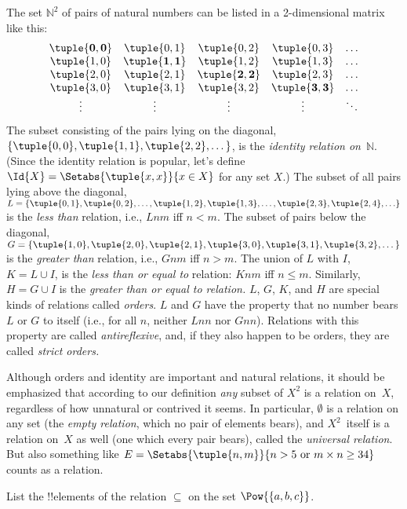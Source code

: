 \documentclass[../../../include/open-logic-section]{subfiles}
\begin{document}
\begin{ex}
The set $\mathbb{N}^{2}$ of
pairs of natural numbers can be listed in a 2-dimensional matrix like
this:
\[
\begin{array}{ccccc}
\mathbf{\tuple{ 0,0 }} & \tuple{ 0,1 } &
  \tuple{ 0,2 } & \tuple{ 0,3 } & \ldots\\
\tuple{ 1,0 } & \mathbf{\tuple{ 1,1 }} &
  \tuple{ 1,2 } & \tuple{ 1,3 } & \ldots\\
\tuple{ 2,0 } & \tuple{ 2,1 } &
  \mathbf{\tuple{ 2,2 }} & \tuple{ 2,3 } & \ldots\\
\tuple{ 3,0 } & \tuple{ 3,1 } & \tuple{ 3,2 } &
  \mathbf{\tuple{ 3,3 }} & \ldots\\
\vdots & \vdots & \vdots & \vdots & \mathbf{\ddots}
\end{array}
\]
The subset consisting of the pairs lying on the diagonal, $\{\tuple{
0,0 }, \tuple{ 1,1 }, \tuple{ 2,2 }, \dots\}$, is the
\emph{identity relation on}~$\mathbb{N}$. (Since the identity
relation is popular, let's define $\Id{X}=\Setabs{\tuple{ x,x }}{x \in
X}$ for any set $X$.) The subset of all pairs lying above the
diagonal, $L = \{\tuple{ 0,1 },\tuple{ 0,2 },\ldots,\tuple{
1,2 }, \tuple{ 1,3 }, \dots, \tuple{ 2,3 }, \tuple{ 2,4
},\ldots\}$ is the \emph{less than} relation, i.e., $Lnm$ iff
$n<m$. The subset of pairs below the diagonal, $G=\{ \tuple{ 1,0
},\tuple{ 2,0 },\tuple{ 2,1 }, \tuple{ 3,0
},\tuple{ 3,1 },\tuple{ 3,2 }, \dots\}$ is the
\emph{greater than} relation, i.e., $Gnm$ iff $n>m$. The union of $L$
with $I$, $K=L\cup I$, is the \emph{less than or equal to} relation:
$Knm$ iff $n \le m$. Similarly, $H=G \cup I$ is the \emph{greater than
  or equal to relation.} $L$, $G$, $K$, and $H$ are special kinds of
relations called \emph{orders}. $L$ and $G$ have the property that no
number bears $L$ or $G$ to itself (i.e., for all $n$, neither $Lnn$
nor $Gnn$). Relations with this property are called
\emph{antireflexive}, and, if they also happen to be orders, they are
called \emph{strict orders.}
\end{ex}

\begin{explain}
Although orders and identity are important and natural relations, it
should be emphasized that according to our definition \emph{any}
subset of $X^{2}$ is a relation on~$X$, regardless of how unnatural or
contrived it seems. In particular, $\emptyset$ is a relation on any
set (the \emph{empty relation}, which no pair of elements bears), and
$X^{2}$~itself is a relation on~$X$ as well (one which every pair
bears), called the \emph{universal relation}. But also something like
$E=\Setabs{\tuple{n, m}}{n>5 \text{ or } m \times n \ge 34}$ counts as
a relation.
\end{explain}

\begin{prob}
List the !!{element}s of the relation $\subseteq$ on the set
$\Pow{\{a, b, c\}}$.
\end{prob}
\end{document}
